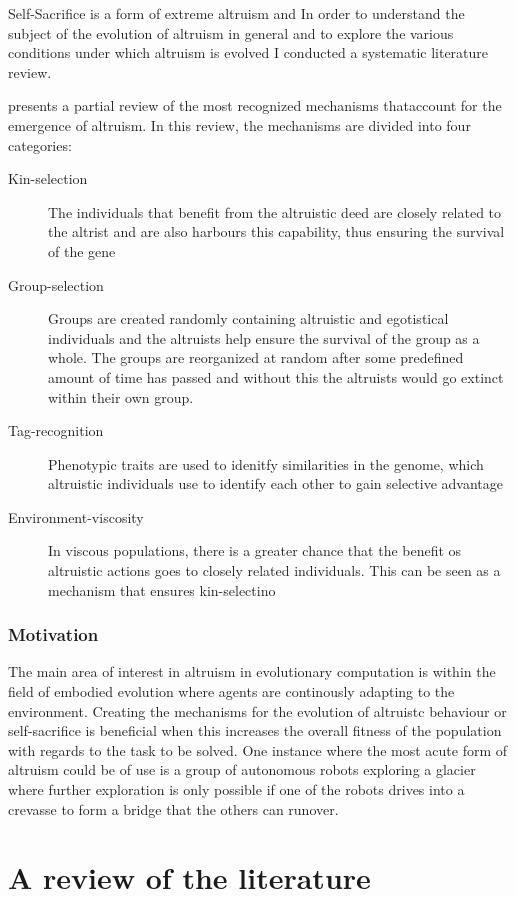 \documentclass[a4paper]{book}
\begin{document}
Self-Sacrifice is a form of extreme altruism and In order to understand the subject of the evolution of altruism in general and to explore the various conditions under which altruism is evolved I conducted a systematic literature review. 


\cite{montanier_environment-driven_2013} presents a partial review of the most recognized mechanisms thataccount for the emergence of altruism. In this review, the mechanisms are divided into four categories:
\begin{description}
\item[Kin-selection] {The individuals that benefit from the altruistic deed are closely related to the altrist and are also harbours this capability, thus ensuring the survival of the gene}
\item[Group-selection] {Groups are created randomly containing altruistic and egotistical individuals and the altruists help ensure the survival of the group as a whole. The groups are reorganized at random after some predefined amount of time has passed and without this the altruists would go extinct within their own group.}
\item[Tag-recognition]{Phenotypic traits are used to idenitfy similarities in the genome, which altruistic individuals use to identify each other to gain selective advantage}
\item[Environment-viscosity] {In viscous populations, there is a greater chance that the benefit os altruistic actions goes to closely related individuals. This can be seen as a mechanism that ensures kin-selectino}
\end{description}


\subsection{Motivation}

The main area of interest in altruism in evolutionary computation is within the field of embodied evolution where agents are continously adapting to the environment. Creating the mechanisms for the evolution of altruistc behaviour or self-sacrifice is beneficial when this increases the overall fitness of the population with regards to the task to be solved. One instance where the most acute form of altruism could be of use is a group of autonomous robots exploring a glacier where further exploration is only possible if one of the robots drives into a crevasse to form a bridge that the others can runover.    
\chapter{A review of the literature}
\label{cha:review}
\end{document}
